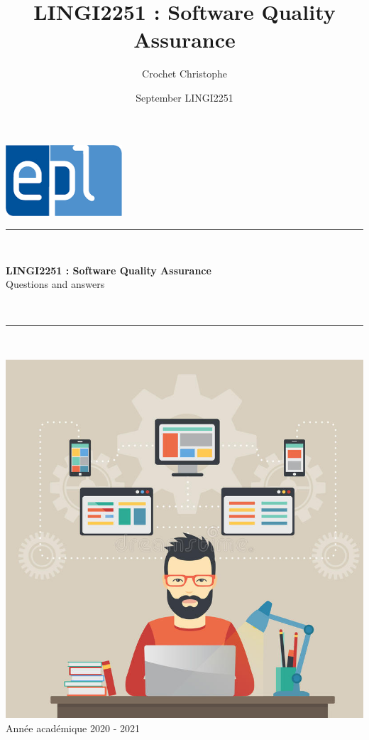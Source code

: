 \documentclass{article}
\title{LINGI2251 : Software Quality Assurance}
\author{Crochet Christophe}
\date{September LINGI2251}
\begin{document}
        \hfill\includegraphics[scale=0.5]{image/logoepl.png}

        \vspace*{\fill}

        \begin{center}

            \rule{1\textwidth}{1pt}\\
	            \vspace{.5\baselineskip}
		            \begin{LARGE}
	                	\textbf{LINGI2251 : Software Quality Assurance}
	                	\\
	                	\vspace{.3em}
	                	Questions and answers
		            \end{LARGE}
		            \\
		        \vspace{.5\baselineskip}
	        \rule{1\textwidth}{1pt}\\

	        \vspace{0.5\baselineskip}

	        \includegraphics[scale=1.5]{image/MCP.jpg}\\

	        \vspace{0.5\baselineskip}
	            Année académique 2020 - 2021\\

		\end{center}
\end{document}
